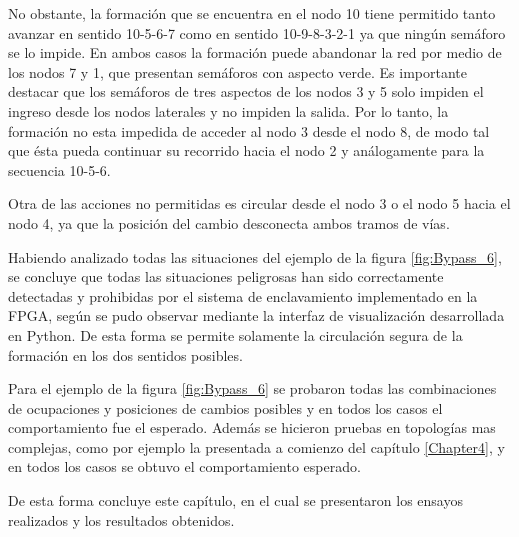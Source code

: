 	No obstante, la formación que se encuentra en el nodo 10 tiene permitido tanto avanzar en sentido 10-5-6-7 como en sentido 10-9-8-3-2-1 ya que ningún semáforo se lo impide. En ambos casos la formación puede abandonar la red por medio de los nodos 7 y 1, que presentan semáforos con aspecto verde. Es importante destacar que los semáforos de tres aspectos de los nodos 3 y 5 solo impiden el ingreso desde los nodos laterales y no impiden la salida. Por lo tanto, la formación no esta impedida de acceder al nodo 3 desde el nodo 8, de modo tal que ésta pueda continuar su recorrido hacia el nodo 2 y análogamente para la secuencia 10-5-6.
	
	Otra de las acciones no permitidas es circular desde el nodo 3 o el nodo 5 hacia el nodo 4, ya que la posición del cambio desconecta ambos tramos de vías.
	
	Habiendo analizado todas las situaciones del ejemplo de la figura \ref{fig:Bypass_6}, se concluye que todas las situaciones peligrosas han sido correctamente detectadas y prohibidas por el sistema de enclavamiento implementado en la FPGA, según se pudo observar mediante la interfaz de visualización desarrollada en Python. De esta forma se permite solamente la circulación segura de la formación en los dos sentidos posibles.
	
	Para el ejemplo de la figura \ref{fig:Bypass_6} se probaron todas las combinaciones de ocupaciones y posiciones de cambios posibles y en todos los casos el comportamiento fue el esperado. Además se hicieron pruebas en topologías mas complejas, como por ejemplo la presentada a comienzo del capítulo \ref{Chapter4}, y en todos los casos se obtuvo el comportamiento esperado.
	
	De esta forma concluye este capítulo, en el cual se presentaron los ensayos realizados y los resultados obtenidos.
